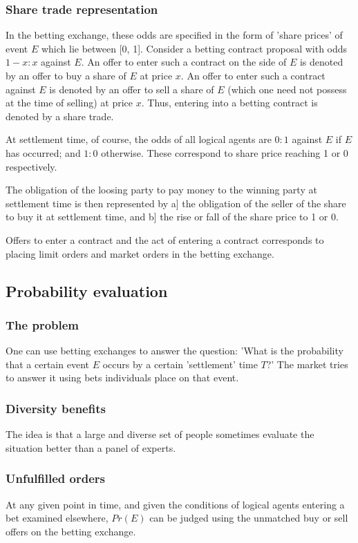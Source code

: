 \documentclass[oneside, article]{memoir}
\begin{document}
\subsubsection{Share trade representation}
In the betting exchange, these odds are specified in the form of 'share prices' of event $E$ which lie between [0, 1]. Consider a betting contract proposal with odds $1-x: x$ against $E$. An offer to enter such a contract on the side of $E$ is denoted by an offer to buy a share of $E$ at price $x$. An offer to enter such a contract against $E$ is denoted by an offer to sell a share of $E$ (which one need not possess at the time of selling) at price $x$. Thus, entering into a betting contract is denoted by a share trade.

At settlement time, of course, the odds of all logical agents are $0:1$ against $E$ if $E$ has occurred; and $1:0$ otherwise. These correspond to share price reaching 1 or 0 respectively.

The obligation of the loosing party to pay money to the winning party at settlement time is then represented by a] the obligation of the seller of the share to buy it at settlement time, and b] the rise or fall of the share price to 1 or 0.

Offers to enter a contract and the act of entering a contract corresponds to placing limit orders and market orders in the betting exchange.

\subsection{Probability evaluation}
\subsubsection{The problem}
One can use betting exchanges to answer the question: 'What is the probability that a certain event $E$ occurs by a certain 'settlement' time $T$?' The market tries to answer it using bets individuals place on that event.

\subsubsection{Diversity benefits}
The idea is that a large and diverse set of people sometimes evaluate the situation better than a panel of experts.

\subsubsection{Unfulfilled orders}
At any given point in time, and given the conditions of logical agents entering a bet examined elsewhere, $Pr(E)$ can be judged using the unmatched buy or sell offers on the betting exchange.
\end{document}
